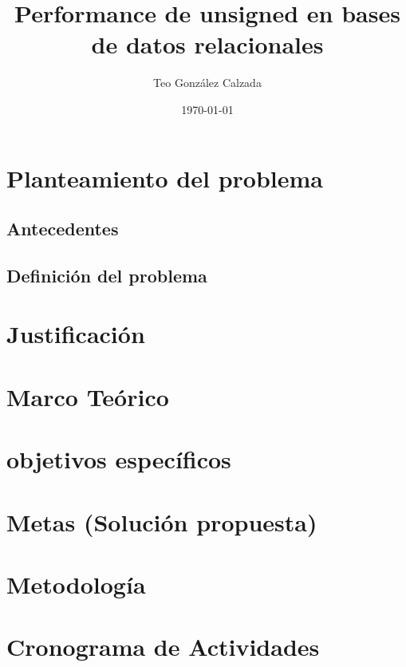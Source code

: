 \documentclass{article}
\title{Performance de unsigned en bases de datos relacionales}
\author{Teo González Calzada}
\date{\today}
\begin{document}


\clearpage

\tableofcontents

\clearpage


\section{Planteamiento del problema}
\subsection{Antecedentes}\label{sec:Ant}



\subsection{Definición del problema}

\section{Justificación}

\section{Marco Teórico}



\section{objetivos específicos}

\section{Metas (Solución propuesta)}

\section{Metodología}

\section{Cronograma de Actividades}



\end{document}
